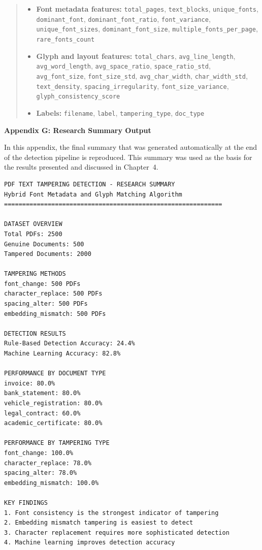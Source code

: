 \begin{quote}
\footnotesize
\begin{itemize}
    \item \textbf{Font metadata features:} \texttt{total\_pages}, \texttt{text\_blocks}, \texttt{unique\_fonts}, \texttt{dominant\_font}, \texttt{dominant\_font\_ratio}, \texttt{font\_variance}, \texttt{unique\_font\_sizes}, \texttt{dominant\_font\_size}, \texttt{multiple\_fonts\_per\_page}, \texttt{rare\_fonts\_count}

    \item \textbf{Glyph and layout features:} \texttt{total\_chars}, \texttt{avg\_line\_length}, \texttt{avg\_word\_length}, \texttt{avg\_space\_ratio}, \texttt{space\_ratio\_std}, \texttt{avg\_font\_size}, \texttt{font\_size\_std}, \texttt{avg\_char\_width}, \texttt{char\_width\_std}, \texttt{text\_density}, \texttt{spacing\_irregularity}, \texttt{font\_size\_variance}, \texttt{glyph\_consistency\_score}

    \item \textbf{Labels:} \texttt{filename}, \texttt{label}, \texttt{tampering\_type}, \texttt{doc\_type}
\end{itemize}
\end{quote}

\vspace{.2in}

\noindent
\textbf{Appendix G: Research Summary Output}

\noindent
In this appendix, the final summary that was generated automatically at the end of the detection pipeline is reproduced. This summary was used as the basis for the results presented and discussed in Chapter~4.

\small
\begin{verbatim}
PDF TEXT TAMPERING DETECTION - RESEARCH SUMMARY
Hybrid Font Metadata and Glyph Matching Algorithm
============================================================

DATASET OVERVIEW
Total PDFs: 2500
Genuine Documents: 500
Tampered Documents: 2000

TAMPERING METHODS
font_change: 500 PDFs
character_replace: 500 PDFs
spacing_alter: 500 PDFs
embedding_mismatch: 500 PDFs

DETECTION RESULTS
Rule-Based Detection Accuracy: 24.4%
Machine Learning Accuracy: 82.8%

PERFORMANCE BY DOCUMENT TYPE
invoice: 80.0%
bank_statement: 80.0%
vehicle_registration: 80.0%
legal_contract: 60.0%
academic_certificate: 80.0%

PERFORMANCE BY TAMPERING TYPE
font_change: 100.0%
character_replace: 78.0%
spacing_alter: 78.0%
embedding_mismatch: 100.0%

KEY FINDINGS
1. Font consistency is the strongest indicator of tampering
2. Embedding mismatch tampering is easiest to detect
3. Character replacement requires more sophisticated detection
4. Machine learning improves detection accuracy
\end{verbatim}
